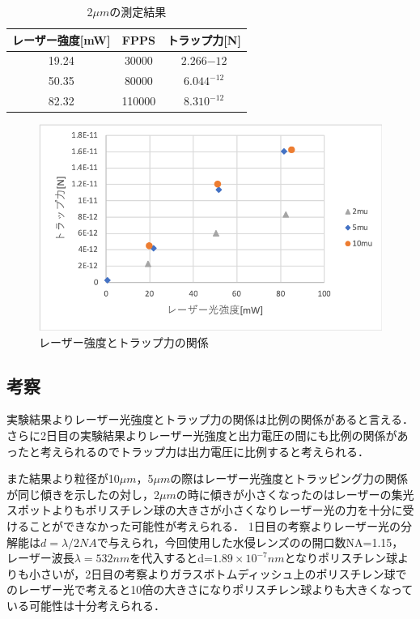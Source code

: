 \documentclass[11pt, a4paper,twocolumn]{jarticle}
\begin{document}
\begin{table}[htbp]
    \begin{center}
        \begin{tabular}{ccc}
            レーザー強度[mW] & FPPS & トラップ力[N]  \\ \hline
            19.24 & 30000 & $2.266{-12}$   \\
            50.35 & 80000 & $6.044^{-12}$   \\
            82.32 & 110000 & $8.310^{-12}$  \\
        \end{tabular}
        \caption{2$\mu m$の測定結果}
        \label{table:4}
    \end{center}
\end{table}

\begin{figure}[htbp]
 \begin{center}
  \includegraphics[width=0.8\linewidth]{fig4.png}
 \end{center}
 \caption{レーザー強度とトラップ力の関係}
 \label{fig:4}
\end{figure}

\subsection{考察}
実験結果よりレーザー光強度とトラップ力の関係は比例の関係があると言える．
さらに2日目の実験結果よりレーザー光強度と出力電圧の間にも比例の関係があったと考えられるのでトラップ力は出力電圧に比例すると考えられる．

また結果より粒径が10$\mu m$，5$\mu m$の際はレーザー光強度とトラッピング力の関係が同じ傾きを示したの対し，2$\mu m$の時に傾きが小さくなったのはレーザーの集光スポットよりもポリスチレン球の大きさが小さくなりレーザー光の力を十分に受けることができなかった可能性が考えられる．
1日目の考察よりレーザー光の分解能は$d=\lambda/{2NA}$で与えられ，今回使用した水侵レンズのの開口数NA=1.15，レーザー波長$\lambda=532nm$を代入するとd=$1.89 \times 10^{-7}nm$となりポリスチレン球よりも小さいが，2日目の考察よりガラスボトムディッシュ上のポリスチレン球でのレーザー光で考えると10倍の大きさになりポリスチレン球よりも大きくなっている可能性は十分考えられる．




\newpage
\end{document}
